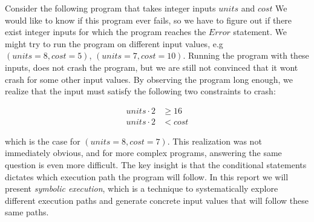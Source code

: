 Consider the following program that takes integer inputs $units$ and $cost$ 
\motexample{}
We would like to know if this program ever fails, so we have to figure out if there exist integer inputs for which the program reaches the $Error$ statement. We might try to run the program on different input values, e.g $(units = 8, cost = 5)$, $(units = 7, cost = 10)$. Running the program with these inputs, does not crash the program, but we are still not convinced that it wont crash for some other input values.
By observing the program long enough, we realize that the input must satisfy the following two constraints to crash:

\begin{align*}
	 units \cdot 2 & \geq 16\\
	 units \cdot 2 & < cost
\end{align*}

which is the case for $(units = 8, cost = 7)$. This realization was not immediately obvious, and for more complex programs, answering the same question is even more difficult. The key insight is that the conditional statements dictates which execution path the program will follow. In this report we will present \emph{symbolic execution}, which is a technique to systematically explore different execution paths and generate concrete input values that will follow these same paths. 